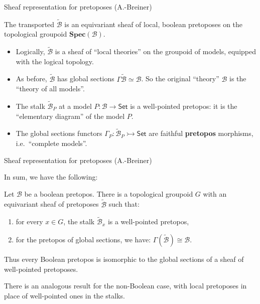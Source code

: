 \documentclass{beamer}
\newcommand{\B}{\ensuremath{\mathcal{B}}}
\newcommand{\myemph}[1]{\textbf{#1}}    %
\newcommand{\Set}{\mathsf{Set}}
\begin{document}
\begin{frame}{Sheaf representation for pretoposes (A.-Breiner)}

The transported $\tilde{\mathcal{B}}$  is an equivariant sheaf of local, boolean pretoposes on the topological groupoid $\mathbf{Spec}(\mathcal{B})$.

\begin{itemize}
\item Logically, $\tilde{\mathcal{B}}$ is a sheaf of ``local theories'' on the groupoid of models, equipped with the logical topology.  

\item As before, $\tilde{\mathcal{B}}$ has global sections $\Gamma\tilde{\mathcal{B}} \simeq \mathcal{B}$.  So the original ``theory'' $\mathcal{B}$ is the ``theory of all models''.

\item The stalk $\tilde{\mathcal{B}}_P$ at a model $P : \mathcal{B} \to \Set$ is a well-pointed pretopos: it is the ``elementary diagram'' of the model $P$.
\medskip

\item The global sections functors $\Gamma_P : \tilde{\mathcal{B}}_P \rightarrowtail \Set$ are faithful \myemph{pretopos} morphisms, i.e.\ ``complete models''.

\end{itemize}
\end{frame}
\begin{frame}{Sheaf representation for pretoposes (A.-Breiner)}

In sum, we have the following:

\begin{theorem}[A.-Breiner 2013]
Let $\B$ be a boolean pretopos.  
There is a topological groupoid $G$ with an equivariant sheaf of pretoposes $\tilde{\B}$ such that:
\begin{enumerate}
\item for every $x\in G$, the stalk $\tilde{\B}_x$ is a well-pointed pretopos, 
\item for the pretopos of global sections, we have: $\Gamma(\tilde{\B}) \cong \B$.
\end{enumerate}
Thus every Boolean pretopos is isomorphic to the global sections of a sheaf of well-pointed pretoposes.  
\end{theorem}
\medskip

There is an analogous result for the non-Boolean case, with local pretoposes in place of well-pointed ones in the stalks.

\end{frame}
\end{document}
